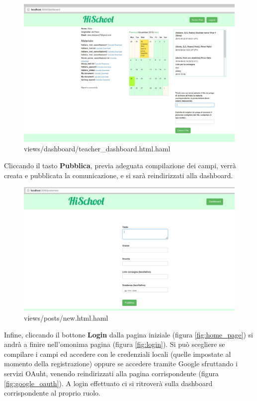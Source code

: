 \documentclass[Lau, binding=0.6cm, oneside]{sapthesis}
\begin{document}
\begin{figure}[H]
	\centering
	\includegraphics[width=1\linewidth]{images/t_dashboard} 
	\caption{views/dashboard/teacher\_dashboard.html.haml}
	\label{fig:t_dashboard}
\end{figure}

Cliccando il tasto \textbf{Pubblica}, previa adeguata compilazione dei campi, verrà creata e pubblicata la comunicazione, e si sarà reindirizzati alla dashboard.\\

\begin{figure}[H]
	\centering
	\includegraphics[width=1\linewidth]{images/new_post} 
	\caption{views/posts/new.html.haml}
	\label{fig:nuovo_post}
\end{figure}

Infine, cliccando il bottone \textbf{Login} dalla pagina iniziale (figura \ref{fig:home_page}) si andrà a finire nell'omonima pagina (figura \ref{fig:login}). Si può scegliere se compilare i campi ed accedere con le credenziali locali (quelle impostate al momento della registrazione) oppure se accedere tramite Google sfruttando i servizi OAuht, venendo reindirizzati alla pagina corrispondente (figura \ref{fig:google_oauth}). 
A login effettuato ci si ritroverà sulla dashboard corrispondente al proprio ruolo.
\end{document}
